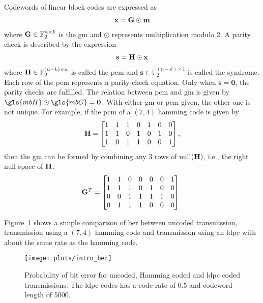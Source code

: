 Codewords of linear block codes are expressed as \begin{align}\mathbf{x}=\mathbf{G}\odot\mathbf{m}\end{align} where $\mathbf{G}\in\mathbb{F}_2^{n\times k}$ is the \gls{gm} and $\odot$ represents multiplication modulo 2. A parity check is described by the expression \begin{align}\mathbf{s}=\mathbf{H}\odot\mathbf{x}\end{align} where $\mathbf{H}\in\mathbb{F}_2^{(n-k)\times n}$ is called the \gls{pcm} and $\mathbf{s}\in\mathbb{F}_2^{(n-k)\times 1}$ is called the syndrome. Each row of the \gls{pcm} represents a parity-check equation. Only when $\mathbf{s}=\mathbf{0}$, the parity checks are fulfilled. The relation between \gls{pcm} and \gls{gm} is given by $\gls{mbH}\odot\gls{mbG}=\mathbf{0}$. With either \gls{gm} or \gls{pcm} given, the other one is not unique. For example, if the \gls{pcm} of a $(7,4)$ hamming code is given by
\begin{align} \label{eq:H_ham}
\mathbf{H} =
\begin{bmatrix}
1 &1 &1 &0 &1 &0 &0 \\
1 &1 &0 &1 &0 &1 &0 \\
1 &0 &1 &1 &0 &0 &1
\end{bmatrix},
\end{align}
then the \gls{gm} can be formed by combining any 3 rows of null$(\mathbf{H})$, i.e., the right null space of $\mathbf{H}$.
\begin{align} \label{eq:G_ham}
\mathbf{G}^T =
\begin{bmatrix}
1 &1 &0 &0 &0 &0 &1 \\
1 &1 &1 &0 &1 &0 &0 \\
0 &0 &1 &1 &1 &1 &0 \\
0 &1 &1 &1 &0 &0 &0
\end{bmatrix}.
\end{align}

Figure~\ref{fig:intro_ber} shows a simple comparison of \gls{ber} between uncoded transmission, transmission using a $(7,4)$ hamming code and transmission using an \gls{ldpc} with about the same rate as the hamming code.
\begin{figure}[htbp]
  \centering
  \texttt{[image: plots/intro\_ber]}
  \caption[Comparison of probability of bit error]{Probability of bit error for uncoded, Hamming coded and \gls{ldpc} coded transmissions. The \gls{ldpc} codes has a code rate of 0.5 and codeword length of 5000.}
  \label{fig:intro_ber}
\end{figure}

